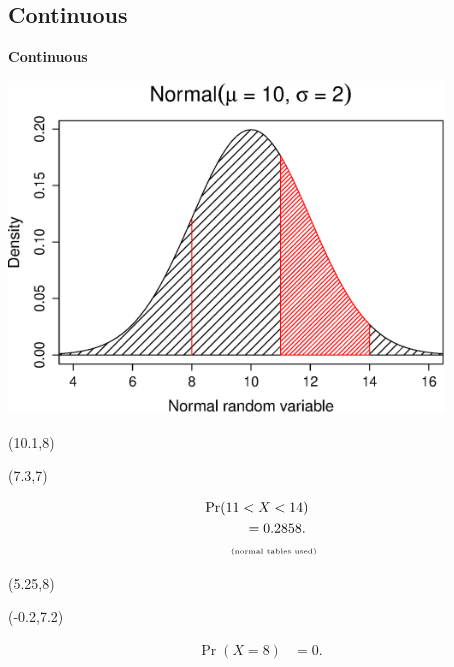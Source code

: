 \documentclass[compress]{beamer}        %
\makeatletter
\newcommand{\tcb}{\textcolor{beamer@blendedblue}}
\makeatother
\begin{document}
\subsection{Continuous}
\begin{frame}{\bf \tcb{Continuous}\\[-1.1cm]}\label{normplot}
\begin{center}
\includegraphics[width=0.87\textwidth, trim = 0.0cm 0.5cm 0.3cm 0.5cm, clip]{Normal}
\end{center}
\begin{textblock}{1}(10.1,8)
\xymatrixcolsep{0.8cm}
\end{textblock}
\begin{textblock}{10}(7.3,7)
\begin{scriptsize}
\begin{align*}
&\Pr(11<X<14) \\ %
&\qquad\quad= 0.2858.\\
&\qquad\text{{\tiny(normal tables used)}}
\end{align*}
\end{scriptsize}
\end{textblock}
\begin{textblock}{1}(5.25,8)
\xymatrixcolsep{1cm}
\end{textblock}
\begin{textblock}{10}(-0.2,7.2)
\begin{scriptsize}
\begin{align*}
\Pr(X=8) &= 0.
\end{align*}
\end{scriptsize}
\end{textblock}
\end{frame}
\end{document}
